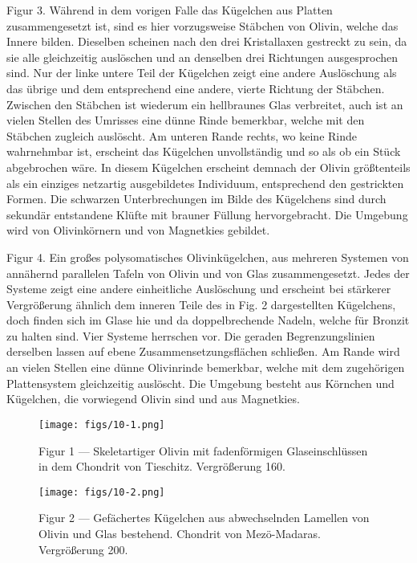 \documentclass[a4paper, 11pt, oneside, polutonikogreek, german]{article}
\begin{document}
Figur 3. Während in dem vorigen Falle das Kügelchen aus Platten zusammengesetzt ist, sind es hier vorzugsweise Stäbchen von Olivin, welche das Innere bilden. Dieselben scheinen nach den drei Kristallaxen gestreckt zu sein, da sie alle gleichzeitig auslöschen und an denselben drei Richtungen ausgesprochen sind. Nur der linke untere Teil der Kügelchen zeigt eine andere Auslöschung als das übrige und dem entsprechend eine andere, vierte Richtung der Stäbchen. Zwischen den Stäbchen ist wiederum ein hellbraunes Glas verbreitet, auch ist an vielen Stellen des Umrisses eine dünne Rinde bemerkbar, welche mit den Stäbchen zugleich auslöscht. Am unteren Rande rechts, wo keine Rinde wahrnehmbar ist, erscheint das Kügelchen unvollständig und so als ob ein Stück abgebrochen wäre. In diesem Kügelchen erscheint demnach der Olivin größtenteils als ein einziges netzartig ausgebildetes Individuum, entsprechend den gestrickten Formen. Die schwarzen Unterbrechungen im Bilde des Kügelchens sind durch sekundär entstandene Klüfte mit brauner Füllung hervorgebracht. Die Umgebung wird von Olivinkörnern und von Magnetkies gebildet.

Figur 4. Ein großes polysomatisches Olivinkügelchen, aus mehreren Systemen von annähernd parallelen Tafeln von Olivin und von Glas zusammengesetzt. Jedes der Systeme zeigt eine andere einheitliche Auslöschung und erscheint bei stärkerer Vergrößerung ähnlich dem inneren Teile des in Fig. 2 dargestellten Kügelchens, doch finden sich im Glase hie und da doppelbrechende Nadeln, welche für Bronzit zu halten sind. Vier Systeme herrschen vor. Die geraden Begrenzungslinien derselben lassen auf ebene Zusammensetzungsflächen schließen. Am Rande wird an vielen Stellen eine dünne Olivinrinde bemerkbar, welche mit dem zugehörigen Plattensystem gleichzeitig auslöscht. Die Umgebung besteht aus Körnchen und Kügelchen, die vorwiegend Olivin sind und aus Magnetkies.
\clearpage

\vspace*{\fill}
\begin{figure}[H]
\centering
\texttt{[image: figs/10-1.png]}
\caption{\small Figur 1 --- Skeletartiger Olivin mit fadenförmigen Glaseinschlüssen in dem Chondrit von Tieschitz. Vergrößerung 160.}
\end{figure}
\vspace*{\fill}
\clearpage

\vspace*{\fill}
\begin{figure}[H]
\centering
\texttt{[image: figs/10-2.png]}
\caption{\small Figur 2 --- Gefächertes Kügelchen aus abwechselnden Lamellen von Olivin und Glas bestehend. Chondrit von Mezö-Madaras. Vergrößerung 200.}
\end{figure}
\vspace*{\fill}
\clearpage
\end{document}
